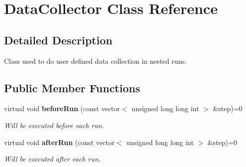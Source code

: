 \section{DataCollector Class Reference}
\label{classDataCollector}


\subsection{Detailed Description}
Class used to do user defined data collection in nested runs. \subsection*{Public Member Functions}
\begin{CompactItemize}
\item 
virtual void {\bf beforeRun} (const vector$<$ unsigned long long int $>$ \&step)=0\label{classDataCollector_0f9ab7094ea0a6b0bfbec4cb8522b4ed}

\begin{CompactList}\small\item\em Will be executed before each run. \item\end{CompactList}\item 
virtual void {\bf afterRun} (const vector$<$ unsigned long long int $>$ \&step)=0\label{classDataCollector_fa23a704c60999eeb9344d87f7b2edf0}

\begin{CompactList}\small\item\em Will be executed after each run. \item\end{CompactList}\end{CompactItemize}

